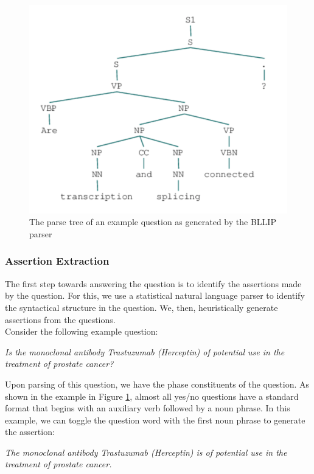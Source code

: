 \begin{figure}[t]
    \centering
    \includegraphics[scale=0.5]{images/question_parse.png}
    \caption{The parse tree of an example question as generated by the BLLIP parser}
    \label{fig:parse_tree}
\end{figure}

\subsubsection{Assertion Extraction}

The first step towards answering the question is to identify the assertions made by the question. For this, we use a statistical natural language parser to identify the syntactical structure in the question. We, then, heuristically generate assertions from the questions.\\

Consider the following example question:

\textit{Is the monoclonal antibody Trastuzumab (Herceptin) of potential use in the treatment of prostate cancer?}

Upon parsing of this question, we have the phase constituents of the question. As shown in the example in Figure \ref{fig:parse_tree}, almost all yes/no questions have a standard format that begins with an auxiliary verb followed by a noun phrase. In this example, we can toggle the question word with the first noun phrase to generate the assertion:

\textit{The monoclonal antibody Trastuzumab (Herceptin) is of potential use in the treatment of prostate cancer.}


